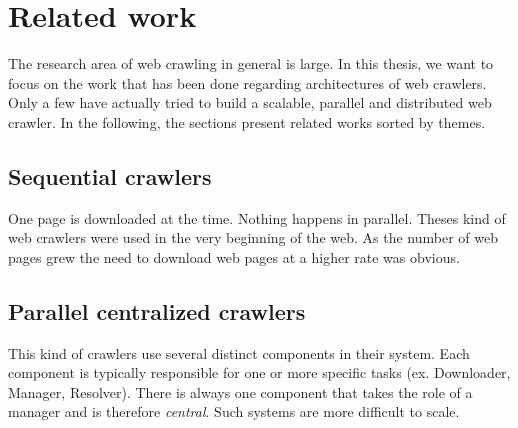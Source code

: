\chapter{Related work} %
The research area of web crawling in general is large. In this thesis, we want to focus on the work that has been done regarding architectures of web crawlers. Only a few have actually tried to build a scalable, parallel and distributed web crawler. In the following, the sections present related works sorted by themes.
\label{Chapter2} %

\section{Sequential crawlers}
One page is downloaded at the time. Nothing happens in parallel. Theses kind of web crawlers were used in the very beginning of the web. As the number of web pages grew the need to download web pages at a higher rate was obvious.

\section{Parallel centralized crawlers}
This kind of crawlers use several distinct components in their system. Each component is typically responsible for one or more specific tasks (ex. Downloader, Manager, Resolver). There is always one component that takes the role of a manager and is therefore \emph{central}. Such systems are more difficult to scale.

